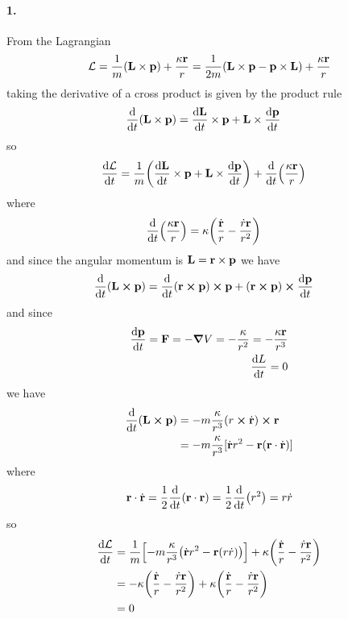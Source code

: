 \documentclass[../main.tex]{subfiles}
\begin{document}
\setcounter{section}{6}

\paragraph*{1.} From the Lagrangian
\begin{align*}
    \mathcal{L} = \frac{1}{m} (\vb L \times \vb p) + \frac{\kappa \vb r}{r} 
        = \frac{1}{2m} (\vb L \times \vb p - \vb p \times \vb L) + \frac{\kappa \vb r}{r}
\end{align*}
taking the derivative of a cross product is given by the product rule
\begin{align*}
    \dv{t}(\vb L \times \vb p) &= \dv{\vb L}{t} \times \vb p + \vb L \times \dv{\vb p}{t}
\end{align*}
so
\begin{align*}
    \dv{\lagr}{t} &= \frac{1}{m} \qt(\dv{\vb L}{t} \times \vb p + \vb L \times \dv{\vb p}{t})
        + \dv{t}( \frac{\kappa \vb r}{r} ) 
\end{align*} 
where
\begin{align*}
    \dv{t}( \frac{\kappa \vb r}{r} ) &= \kappa \qt(\frac{\dot{\vb r}}{r} - \frac{\dot r \vb r}{r^2})
\end{align*}
and since the angular momentum is $\vb L = \vb r \times \vb p$ we have
\begin{align*}
    \dv{t}(\vb L \cross \vb p) &= \dv{t}(\vb r \cross \vb p)\cross \vb p + (\vb r \cross \vb p) \cross \dv{\vb p}{t}
\end{align*}
and since 
\begin{align*}
    \dv{\vb p}{t} = \vb F = -\grad V = - \frac{\kappa}{r^2} = -\frac{\kappa\vb r}{r^3} \\
    \dv{L}{t} = 0
\end{align*}
we have
\begin{align*}
    \dv{t}(\vb L \cross \vb p) &= -m\frac{\kappa}{r^3} (r \cross \dot{\vb r}) \cross \vb r \\
    &= -m\frac{\kappa}{r^3} [\dot{\vb r}r^2 - \vb r (\vb r \cdot \dot{\vb r})] 
\end{align*}
where 
\begin{align*}
    \vb r \cdot \dot{\vb r} = \frac{1}{2} \dv{t}(\vb r \cdot \vb r) = \frac{1}{2} \dv{t}(r^2) = r\dot r
\end{align*}
so 
\begin{align*}
    \dv{\lagr}{t} &= \frac{1}{m} \qt[-m \frac{\kappa}{r^3} \qt(\dot{\vb r}r^2 - \vb r(r \dot r))] + 
        \kappa \qt(\frac{\dot{\vb r}}{r} - \frac{\dot r \vb r}{r^2}) \\
        &= -\kappa \qt(\frac{\dot{\vb r}}{r} - \frac{\dot r \vb r}{r^2}) + \kappa \qt(\frac{\dot{\vb r}}{r} - \frac{\dot r \vb r}{r^2}) \\
        &= 0
\end{align*}
\end{document}
